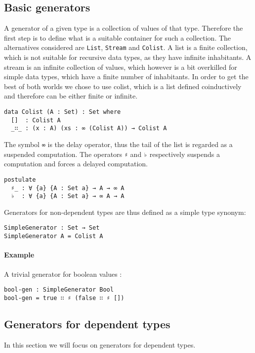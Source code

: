\documentclass[10pt,a4paper]{article}
\begin{document}
\subsection{Basic generators}
A generator of a given type is a collection of values of that type.
Therefore the first step is to define what is a suitable container for such a collection. The alternatives considered are \texttt{List}, \texttt{Stream} and \texttt{Colist}. A list is a finite collection, which is not suitable for recursive data types, as they have infinite inhabitants. A stream is an infinite collection of values, which however is a bit overkilled for simple data types, which have a finite number of inhabitants. In order to get the best of both worlds we chose to use colist, which is a list defined coinductively and therefore can be either finite or infinite.

\begin{verbatim}
data Colist (A : Set) : Set where
  []  : Colist A
  _∷_ : (x : A) (xs : ∞ (Colist A)) → Colist A
\end{verbatim}
The symbol \texttt{∞} is the delay operator, thus the tail of the list is regarded as a suspended computation. The operators \texttt{♯} and \texttt{♭} respectively suspends a computation and forces a delayed computation.
\begin{verbatim}
postulate
  ♯_ : ∀ {a} {A : Set a} → A → ∞ A
  ♭  : ∀ {a} {A : Set a} → ∞ A → A
\end{verbatim}  
Generators for non-dependent types are thus defined as a simple type synonym:
\begin{verbatim}
SimpleGenerator : Set → Set
SimpleGenerator A = Colist A
\end{verbatim}

\paragraph{Example}
A trivial generator for boolean values : 
\begin{verbatim}
bool-gen : SimpleGenerator Bool
bool-gen = true ∷ ♯ (false ∷ ♯ [])
\end{verbatim}

\subsection{Generators for dependent types}
In this section we will focus on generators for dependent types.
\end{document}

